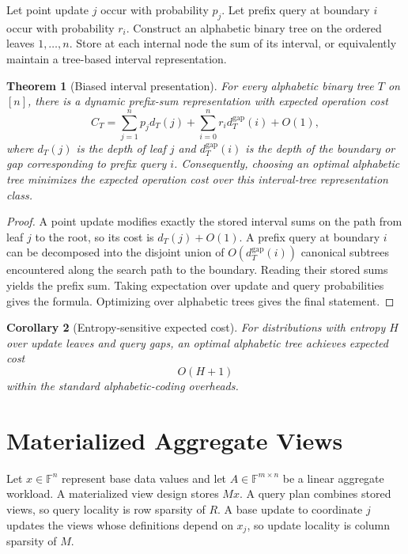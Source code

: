 \documentclass[11pt]{article}
\newtheorem{theorem}{Theorem}[section]
\newtheorem{corollary}[theorem]{Corollary}
\begin{document}
Let point update $j$ occur with probability $p_j$. Let prefix query at boundary $i$ occur with probability $r_i$. Construct an alphabetic binary tree on the ordered leaves $1,\ldots,n$. Store at each internal node the sum of its interval, or equivalently maintain a tree-based interval representation.

\begin{theorem}[Biased interval presentation]
For every alphabetic binary tree $T$ on $[n]$, there is a dynamic prefix-sum representation with expected operation cost
\[
C_T
=
\sum_{j=1}^n p_j d_T(j)
+
\sum_{i=0}^{n} r_i d_T^{\mathrm{gap}}(i)
+
O(1),
\]
where $d_T(j)$ is the depth of leaf $j$ and $d_T^{\mathrm{gap}}(i)$ is the depth of the boundary or gap corresponding to prefix query $i$. Consequently, choosing an optimal alphabetic tree minimizes the expected operation cost over this interval-tree representation class.
\end{theorem}

\begin{proof}
A point update modifies exactly the stored interval sums on the path from leaf $j$ to the root, so its cost is $d_T(j)+O(1)$. A prefix query at boundary $i$ can be decomposed into the disjoint union of $O(d_T^{\mathrm{gap}}(i))$ canonical subtrees encountered along the search path to the boundary. Reading their stored sums yields the prefix sum. Taking expectation over update and query probabilities gives the formula. Optimizing over alphabetic trees gives the final statement.
\end{proof}

\begin{corollary}[Entropy-sensitive expected cost]
For distributions with entropy $H$ over update leaves and query gaps, an optimal alphabetic tree achieves expected cost
\[
O(H+1)
\]
within the standard alphabetic-coding overheads.
\end{corollary}

\section{Materialized Aggregate Views}

Let $x\in\mathbb F^n$ represent base data values and let $A\in\mathbb F^{m\times n}$ be a linear aggregate workload. A materialized view design stores $Mx$. A query plan combines stored views, so query locality is row sparsity of $R$. A base update to coordinate $j$ updates the views whose definitions depend on $x_j$, so update locality is column sparsity of $M$.
\end{document}
